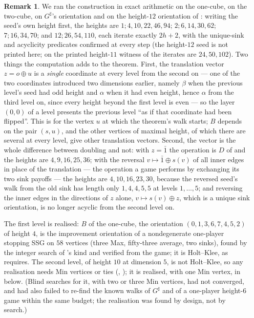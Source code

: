 \documentclass[11pt]{article}
\theoremstyle{plain}
\theoremstyle{definition}
\newtheorem{remark}[theorem]{Remark}
\begin{document}
\begin{remark}\label{rem:blowup-measured}
We ran the construction in exact arithmetic on the one-cube, on the
two-cube, on $G^{\sharp}$'s orientation and on the height-$12$
orientation of : writing the seed's own height
first, the heights are $1;4,10,22,46,94$; $2;6,14,30,62$; $7;16,34,70$;
and $12;26,54,110$, each iterate exactly $2h+2$, with the unique-sink and
acyclicity predicates confirmed at every step (the height-$12$ seed is
not printed here; on the printed height-$11$ witness of 
the iterates are $24,50,102$). Two
things the computation adds to the theorem. First, the translation vector
$z=o\oplus u$ is a \emph{single} coordinate at every level from the second
on --- one of the two coordinates introduced two dimensions earlier, namely
$\beta$ when the previous level's seed had odd height and $\alpha$ when it
had even height, hence $\alpha$ from the third level on, since every height
beyond the first level is even --- so the layer $(0,0)$ of a level presents
the previous level ``as if that coordinate had been flipped''. This is for
the vertex $u$ at which the theorem's walk starts; $B$ depends on the pair
$(s,u)$, and the other vertices of maximal height, of which there are
several at every level, give other translation vectors. Second, the vector is the whole difference
between doubling and not: with $z=\bar1$ the operation is $D$ of
 and the heights are $4,9,16,25,36$; with the
reversal $v\mapsto\bar1\oplus s(v)$ of all inner edges in place of the
translation --- the operation a game performs by exchanging its two sink
payoffs --- the heights are $4,10,16,23,30$, because the reversed
seed's walk from the old sink has length only $1,4,4,5,5$ at levels
$1,\dots,5$; and
reversing the inner edges in the directions of $z$ alone, $v\mapsto
s(v)\oplus z$, which is a unique sink orientation, is no longer acyclic
from the second level on.

The first level is realised: $B$ of the one-cube, the orientation
$(0,1,3,6,7,4,5,2)$ of height $4$, is the improvement orientation of a
nondegenerate one-player stopping SSG on $58$ vertices (three Max,
fifty-three average, two sinks), found by the integer search of
's kind and verified from the game; it is Holt--Klee,
as  requires. The second level, of height $10$ at
dimension $5$, is not Holt--Klee, so any realisation needs Min vertices
or ties (, ); it is
realised, with one Min vertex, in  below. (Blind
searches for it, with two or three Min vertices, had not converged, and
had also failed to re-find the known walks of $G^{\sharp}$ and of a
one-player height-$6$ game within the same budget; the realisation was
found by design, not by search.)


\end{remark}
\end{document}
